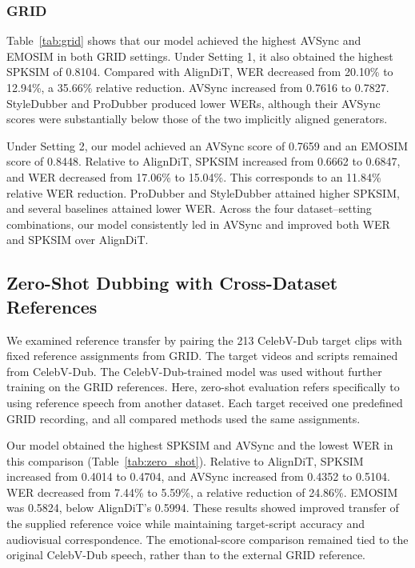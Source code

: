 \subsubsection{GRID}

Table~\ref{tab:grid} shows that our model achieved the highest AVSync and EMOSIM in both GRID settings. Under Setting 1, it also obtained the highest SPKSIM of 0.8104. Compared with AlignDiT, WER decreased from 20.10\% to 12.94\%, a 35.66\% relative reduction. AVSync increased from 0.7616 to 0.7827. StyleDubber and ProDubber produced lower WERs, although their AVSync scores were substantially below those of the two implicitly aligned generators.

Under Setting 2, our model achieved an AVSync score of 0.7659 and an EMOSIM score of 0.8448. Relative to AlignDiT, SPKSIM increased from 0.6662 to 0.6847, and WER decreased from 17.06\% to 15.04\%. This corresponds to an 11.84\% relative WER reduction. ProDubber and StyleDubber attained higher SPKSIM, and several baselines attained lower WER. Across the four dataset--setting combinations, our model consistently led in AVSync and improved both WER and SPKSIM over AlignDiT.

\subsection{Zero-Shot Dubbing with Cross-Dataset References}
\label{sec:zero_shot_experiment}

We examined reference transfer by pairing the 213 CelebV-Dub target clips with fixed reference assignments from GRID. The target videos and scripts remained from CelebV-Dub. The CelebV-Dub-trained model was used without further training on the GRID references. Here, zero-shot evaluation refers specifically to using reference speech from another dataset. Each target received one predefined GRID recording, and all compared methods used the same assignments.



Our model obtained the highest SPKSIM and AVSync and the lowest WER in this comparison (Table~\ref{tab:zero_shot}). Relative to AlignDiT, SPKSIM increased from 0.4014 to 0.4704, and AVSync increased from 0.4352 to 0.5104. WER decreased from 7.44\% to 5.59\%, a relative reduction of 24.86\%. EMOSIM was 0.5824, below AlignDiT's 0.5994. These results showed improved transfer of the supplied reference voice while maintaining target-script accuracy and audiovisual correspondence. The emotional-score comparison remained tied to the original CelebV-Dub speech, rather than to the external GRID reference.

